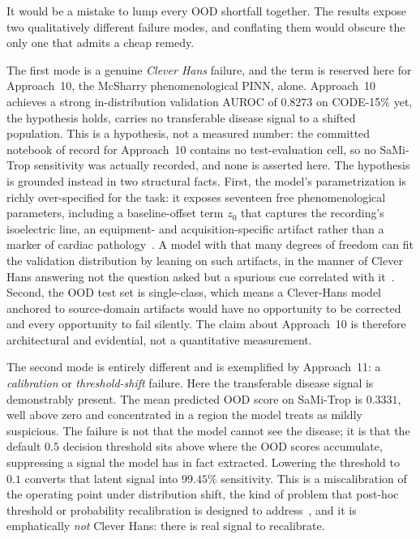 It would be a mistake to lump every OOD shortfall together. The results expose two qualitatively different failure modes, and conflating them would obscure the only one that admits a cheap remedy.

The first mode is a genuine \emph{Clever Hans} failure, and the term is reserved here for Approach~10, the McSharry phenomenological PINN, alone. Approach~10 achieves a strong in-distribution validation AUROC of $0.8273$ on CODE-15\% yet, the hypothesis holds, carries no transferable disease signal to a shifted population. This is a hypothesis, not a measured number: the committed notebook of record for Approach~10 contains no test-evaluation cell, so no SaMi-Trop sensitivity was actually recorded, and none is asserted here. The hypothesis is grounded instead in two structural facts. First, the model's parametrization is richly over-specified for the task: it exposes seventeen free phenomenological parameters, including a baseline-offset term $z_0$ that captures the recording's isoelectric line, an equipment- and acquisition-specific artifact rather than a marker of cardiac pathology~\cite{mcsharry2003dynamical}. A model with that many degrees of freedom can fit the validation distribution by leaning on such artifacts, in the manner of Clever Hans answering not the question asked but a spurious cue correlated with it~\cite{muller2019does}. Second, the OOD test set is single-class, which means a Clever-Hans model anchored to source-domain artifacts would have no opportunity to be corrected and every opportunity to fail silently. The claim about Approach~10 is therefore architectural and evidential, not a quantitative measurement.

The second mode is entirely different and is exemplified by Approach~11: a \emph{calibration} or \emph{threshold-shift} failure. Here the transferable disease signal is demonstrably present. The mean predicted OOD score on SaMi-Trop is $0.3331$, well above zero and concentrated in a region the model treats as mildly suspicious. The failure is not that the model cannot see the disease; it is that the default $0.5$ decision threshold sits above where the OOD scores accumulate, suppressing a signal the model has in fact extracted. Lowering the threshold to $0.1$ converts that latent signal into $99.45\%$ sensitivity. This is a miscalibration of the operating point under distribution shift, the kind of problem that post-hoc threshold or probability recalibration is designed to address~\cite{guo2017calibration}, and it is emphatically \emph{not} Clever Hans: there is real signal to recalibrate.

